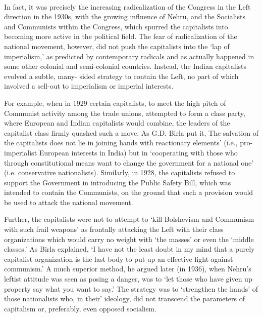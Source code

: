 \paragraph*{}

In fact, it was precisely the increasing radicalization of the Congress in the Left direction in the 1930s, with the growing influence of Nehru, and the Socialists and Communists within the Congress, which spurred the capitalists into becoming more active in the political field. The fear of radicalization of the national movement, however, did not push the capitalists into the `lap of imperialism,' as predicted by contemporary radicals and as actually happened in some other colonial and semi-colonial countries. Instead, the Indian capitalists evolved a subtle, many- sided strategy to contain the Left, no part of which involved a sell-out to imperialism or imperial interests. 

For example, when in 1929 certain capitalists, to meet the high pitch of Communist activity among the trade unions, attempted to form a class party, where European and Indian capitalists would combine, the leaders of the capitalist class firmly quashed such a move. As G.D. Birla put it, The salvation of the capitalists does not lie in joining hands with reactionary elements' (i.e., pro-imperialist European interests in India) but in `cooperating with those who through constitutional means want to change the government for a national one' (i.e. conservative nationalists). Similarly, in 1928, the capitalists refused to support the Government in introducing the Public Safety Bill, which was intended to contain the Communists, on the ground that such a provision would be used to attack the national movement. 

Further, the capitalists were not to attempt to `kill Bolshevism and Communism with such frail weapons' as frontally attacking the Left with their class organizations which would carry no weight with `the masses' or even the `middle classes.' As Birla explained, `I have not the least doubt in my mind that a purely capitalist organization is the last body to put up an effective fight against communism.' A much superior method, he argued later (in 1936), when Nehru's leftist attitude was seen as posing a danger, was to `let those who have given up property say what you want to say.' The strategy was to `strengthen the hands' of those nationalists who, in their' ideology, did not transcend the parameters of capitalism or, preferably, even opposed socialism. 

